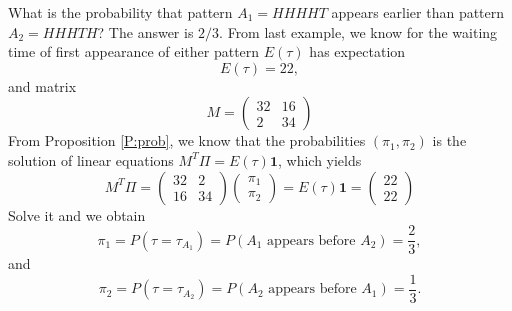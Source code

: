 \begin{example}
What is the probability that pattern $A_1=HHHHT$ appears earlier than pattern
$A_2=HHHTH$? The answer is $2/3$. From last example, we know for the waiting
time of first appearance of either pattern $E(\tau)$ has expectation
\[
  E(\tau)=22,
\]
and matrix
  \[
    M=
    \begin{pmatrix}
      32  &16 \\
      2   &34 
    \end{pmatrix}
  \]
From Proposition \ref{P:prob}, we know that the probabilities $(\pi_1,\pi_2)$ 
is the solution of linear equations $M^T \Pi=E(\tau) \mathbf{1}$, which yields
\[
  M^T \Pi =
  \begin{pmatrix}
    32  &2  \\
    16  &34
  \end{pmatrix}
  \begin{pmatrix}
    \pi_1 \\
    \pi_2
  \end{pmatrix}
  = E(\tau) \mathbf{1} =
  \begin{pmatrix}
    22 \\
    22 
  \end{pmatrix}
\]
Solve it and we obtain
\[
  \pi_1 = P(\tau=\tau_{A_1}) = P(\text{$A_1$ appears before $A_2$}) 
        = \frac{2}{3},
\]
and
\[
  \pi_2 = P(\tau=\tau_{A_2}) = P(\text{$A_2$ appears before $A_1$}) 
        = \frac{1}{3}.
\]
\end{example}


